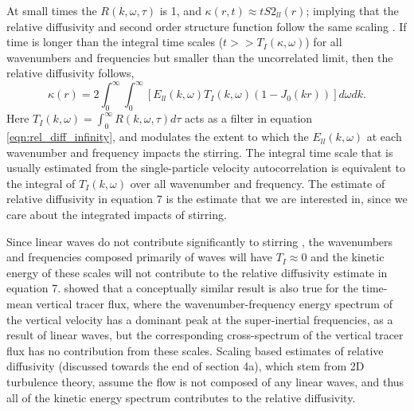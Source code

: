 \documentclass[]{ametsoc}
\begin{document}
At small times the $R(k, \omega, \tau)$ is 1, and $\kappa(r,t) \approx t S2_{ll}(r) $; implying that the relative diffusivity and second order structure function follow the same scaling \citep{babiano1990relative}. If time is longer than the integral time scales ($t>>T_I(\kappa, \omega)$) for all wavenumbers and frequencies but smaller than the uncorrelated limit, then the relative diffusivity follows, 
\begin{equation}
\kappa(r) = 2\int_0^\infty \int_0^\infty \left[  E_{ll}(k, \omega) T_I(k, \omega)  (1- J_0(kr))  \right] d\omega dk.
\label{eqn:rel_diff_infinity}
\end{equation}
Here $T_I (k, \omega) = \int_0^\infty R(k, \omega, \tau) d\tau$ acts as a filter in equation \ref{eqn:rel_diff_infinity}, and modulates the extent to which the $E_{ll}(k,\omega)$ at each wavenumber and frequency impacts the stirring. The integral time scale that is usually estimated from the single-particle velocity autocorrelation \citep{lacasce2008statistics, balwada2016} is equivalent to the integral of $T_I(k,\omega)$ over all wavenumber and frequency. The estimate of relative diffusivity in equation 7 is the estimate that we are interested in, since we care about the integrated impacts of stirring.

Since linear waves do not contribute significantly to stirring \citep{buhler2013strong}, the wavenumbers and frequencies composed primarily of waves will have $T_I \approx 0$ and the kinetic energy of these scales will not contribute to the relative diffusivity estimate in equation 7. \citet{balwada2018submesoscale} showed that a conceptually similar result is also true for the time-mean vertical tracer flux, where the wavenumber-frequency energy spectrum of the vertical velocity has a dominant peak at the super-inertial frequencies, as a result of linear waves, but the corresponding cross-spectrum of the vertical tracer flux has no contribution from these scales. Scaling based estimates of relative diffusivity (discussed towards the end of section 4a), which stem from 2D turbulence theory, assume the flow is not composed of any linear waves, and thus all of the kinetic energy spectrum contributes to the relative diffusivity.
\end{document}
